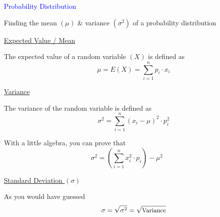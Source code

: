 \documentclass[14pt,fleqn]{extarticle}
\begin{document}

\begin{skill}
\begin{narrow}
\textcolor{blue}{Probability Distribution}

Finding the mean $(\mu)$ \& 
variance $(\sigma^2)$ of a probability distribution
\end{narrow}

%

\reason

\underline{Expected Value / Mean}\newline

The expected value of  a random 
variable $(X)$ is defined as 
\[ \qquad\mu = E(X) = \sum_{i=1}^n p_i\cdot x_i\]

\underline{Variance}\newline 

The variance of the random variable is
defined as 
\[ \qquad \sigma^2 = \sum_{i=1}^n (x_i - \mu)^2\cdot p_i^2\] 

With a little algebra, you can prove 
that \[ \sigma^2 = \left(\sum_{i=1}^n x_i^2\cdot p_i\right)- \mu^2 \] 

\underline{Standard Deviation $(\sigma)$}\newline

As you would have guessed 
\[\qquad \sigma = \sqrt{\sigma^2} = \sqrt{\text{\small{Variance}}}\]
%


\end{skill}
\end{document}
